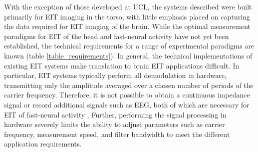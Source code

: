 With the exception of those developed at UCL, the systems described were built primarily for EIT imaging in the torso, with little emphasis placed on capturing the data required for EIT imaging of the brain. While the optimal measurement paradigms for EIT of the head and fast-neural activity have not yet been established, the technical requirements for a range of experimental paradigms are known (table \ref{table_requirements}). In general, the technical implementations of existing EIT systems make translation to brain EIT applications difficult. In particular, EIT systems typically perform all demodulation in hardware, transmitting only the amplitude averaged over a chosen number of periods of the carrier frequency. Therefore, it is not possible to obtain a continuous impedance signal or record additional signals such as EEG, both of which are necessary for EIT of fast-neural activity \cite{Aristovich_2016}. Further, performing the signal processing in hardware severely limits the ability to adjust parameters such as carrier frequency, measurement speed, and filter bandwidth to meet the different application requirements.
